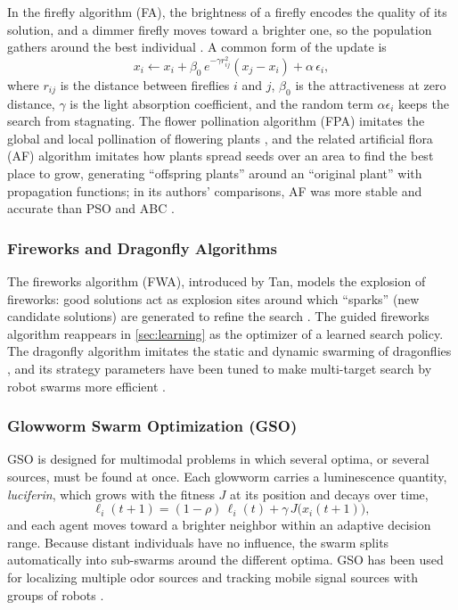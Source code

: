 In the firefly algorithm (FA), the brightness of a firefly encodes the quality of
its solution, and a dimmer firefly moves toward a brighter one, so the
population gathers around the best individual \cite{yang2009firefly}. A common
form of the update is
\begin{equation}
  x_i \leftarrow x_i + \beta_0\, e^{-\gamma r_{ij}^{2}} \left(x_j - x_i\right)
        + \alpha\, \epsilon_i,
  \label{eq:firefly}
\end{equation}
where $r_{ij}$ is the distance between fireflies $i$ and $j$, $\beta_0$ is the
attractiveness at zero distance, $\gamma$ is the light absorption coefficient,
and the random term $\alpha \epsilon_i$ keeps the search from stagnating. The
flower pollination algorithm (FPA) imitates the global and local pollination of
flowering plants \cite{yang2012flower}, and the related artificial flora (AF)
algorithm imitates how plants spread seeds over an area to find the best place to
grow, generating ``offspring plants'' around an ``original plant'' with
propagation functions; in its authors' comparisons, AF was more stable and
accurate than PSO and ABC \cite{cheng2018artificial}.

\subsubsection{Fireworks and Dragonfly Algorithms}

The fireworks algorithm (FWA), introduced by Tan, models the explosion of
fireworks: good solutions act as explosion sites around which ``sparks''
(new candidate solutions) are generated to refine the search \cite{tan2010fireworks}.
The guided fireworks algorithm reappears in \cref{sec:learning} as the optimizer
of a learned search policy. The dragonfly algorithm imitates the static and
dynamic swarming of dragonflies \cite{mirjalili2016dragonfly}, and its strategy
parameters have been tuned to make multi-target search by robot swarms more
efficient \cite{bhowmick2024bio}.

\subsubsection{Glowworm Swarm Optimization (GSO)}

GSO is designed for multimodal problems in which several optima, or several
sources, must be found at once. Each glowworm carries a luminescence quantity,
\emph{luciferin}, which grows with the fitness $J$ at its position and decays
over time,
\begin{equation}
  \ell_i(t+1) = (1-\rho)\,\ell_i(t) + \gamma\, J\bigl(x_i(t+1)\bigr),
  \label{eq:gso}
\end{equation}
and each agent moves toward a brighter neighbor within an adaptive decision
range. Because distant individuals have no influence, the swarm splits
automatically into sub-swarms around the different optima. GSO has been used
for localizing multiple odor sources and tracking mobile signal sources with
groups of robots \cite{krishnanand2009glowworm,panigrahi2011handbook}.

